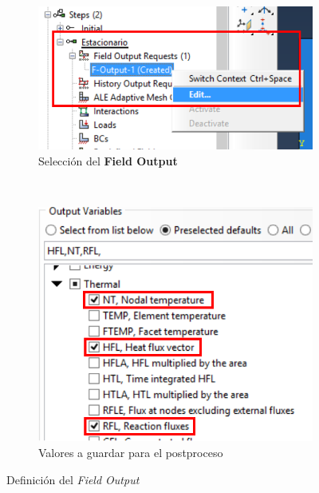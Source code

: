   \begin{figure}[!h]
    \centering
    \begin{subfigure}[!h]{0.45\textwidth}
      \includegraphics[width=\textwidth]{./body/images/step04.pdf}
      \caption{Selección del \textbf{Field Output}}
      \label{step04}
    \end{subfigure}%
    ~ %
    \begin{subfigure}[!h]{0.45\textwidth}
      \includegraphics[width=\textwidth]{./body/images/step05.pdf}
      \caption{Valores a guardar para el postproceso}
      \label{step05}
    \end{subfigure}%
    \caption{Definición del \textit{Field Output}}
  \end{figure}

